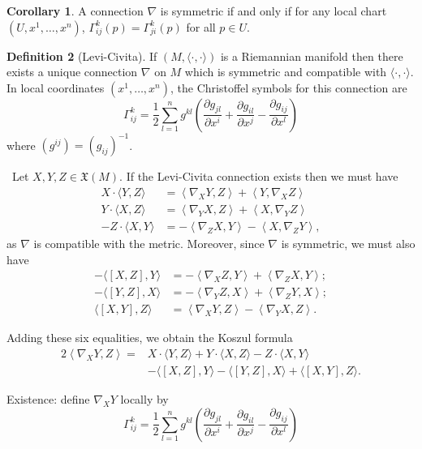 \documentclass[12pt,a4paper]{book}
\newenvironment{prooff}{{\noindent\it\textcolor{cyan!40!black}{Proof}:}\,}{\par}
\theoremstyle{definition}
\newtheorem{defn}{Definition}[section]
\newtheorem{coro}[defn]{Corollary}
\begin{document}
\begin{coro}
    A connection $\nabla$ is symmetric if and only if for any local chart $(U,x^1,\dots,x^n)$, $\Gamma_{ij}^k(p)=\Gamma_{ji}^k(p)$ for all $p\in U$.
\end{coro}
\begin{defn}[Levi-Civita]
    If $(M,\langle\cdot, \cdot\rangle)$ is a Riemannian manifold then there exists a unique connection $\nabla$ on $M$ which is symmetric and compatible with $\langle\cdot, \cdot\rangle$. In local coordinates $\left(x^1, \ldots, x^n\right)$, the Christoffel symbols for this connection are
    $$
        \Gamma_{i j}^k=\frac{1}{2} \sum_{l=1}^n g^{k l}\left(\frac{\partial g_{j l}}{\partial x^i}+\frac{\partial g_{i l}}{\partial x^j}-\frac{\partial g_{i j}}{\partial x^l}\right)
    $$
    where $\left(g^{i j}\right)=\left(g_{i j}\right)^{-1}$.
\end{defn}
\begin{prooff}
    Let $X, Y, Z \in \mathfrak{X}(M)$. If the Levi-Civita connection exists then we must have
    $$
        \begin{aligned}
            X \cdot\langle Y, Z\rangle  & =\left\langle\nabla_X Y, Z\right\rangle+\left\langle Y, \nabla_X Z\right\rangle   \\
            Y \cdot\langle X, Z\rangle  & =\left\langle\nabla_Y X, Z\right\rangle+\left\langle X, \nabla_Y Z\right\rangle   \\
            -Z \cdot\langle X, Y\rangle & =-\left\langle\nabla_Z X, Y\right\rangle-\left\langle X, \nabla_Z Y\right\rangle,
        \end{aligned}
    $$
    as $\nabla$ is compatible with the metric. Moreover, since $\nabla$ is symmetric, we must also have
    $$
        \begin{aligned}
            -\langle[X, Z], Y\rangle & =-\left\langle\nabla_X Z, Y\right\rangle+\left\langle\nabla_Z X, Y\right\rangle ; \\
            -\langle[Y, Z], X\rangle & =-\left\langle\nabla_Y Z, X\right\rangle+\left\langle\nabla_Z Y, X\right\rangle ; \\
            \langle[X, Y], Z\rangle  & =\left\langle\nabla_X Y, Z\right\rangle-\left\langle\nabla_Y X, Z\right\rangle .
        \end{aligned}
    $$

    Adding these six equalities, we obtain the Koszul formula
    $$
        \begin{aligned}
            2\left\langle\nabla_X Y, Z\right\rangle= & X \cdot\langle Y, Z\rangle+Y \cdot\langle X, Z\rangle-Z \cdot\langle X, Y\rangle \\
                                                     & -\langle[X, Z], Y\rangle-\langle[Y, Z], X\rangle+\langle[X, Y], Z\rangle .
        \end{aligned}
    $$

    Existence: define $\nabla_X Y$ locally by
    $$
        \Gamma_{i j}^k=\frac{1}{2} \sum_{l=1}^n g^{k l}\left(\frac{\partial g_{j l}}{\partial x^i}+\frac{\partial g_{i l}}{\partial x^j}-\frac{\partial g_{i j}}{\partial x^l}\right)
    $$
\end{prooff}
\end{document}
